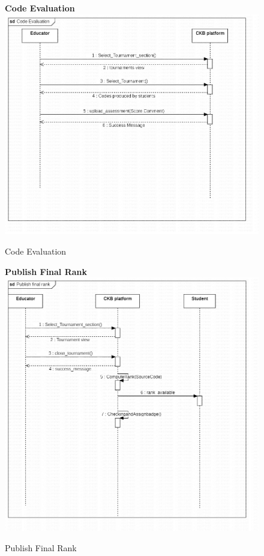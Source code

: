 \begin{enumerate}[label=\textbf{[UC\arabic*]}]
\begin{enumerate}[label=\textbf{[UC\arabic*]}]
    \begin{figure}
    \item \textbf{Code Evaluation}
        \centering
        \includegraphics[width= \textwidth]{Images/f4c0a22a-3bab-4ba7-8605-08f8577774b5}
        \caption{Code Evaluation}
        \label{fig:enter-label}
    \end{figure}
    
    \begin{figure}
    \item \textbf{Publish Final Rank}
        \centering
        \includegraphics[width= \textwidth]{Images/e08ea53b-0385-4fb7-8284-6672fda72856}
        \caption{Publish Final Rank}
        \label{fig:enter-label}
    \end{figure}


\end{enumerate}
\end{enumerate}
